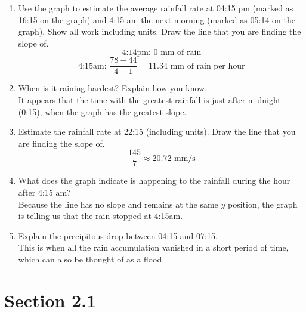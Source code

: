 \documentclass{article}
\begin{document}
\begin{enumerate}
\begin{enumerate}
	\item Use the graph to estimate the average rainfall rate at 04:15 pm (marked as 16:15 on the graph) and 4:15 am the next morning (marked as 05:14 on the graph). Show all work including units. Draw the line that you are finding the slope of. $$\text{4:14pm: }0 \text{ mm of rain}$$
	$$\text{4:15am: }\frac{78-44}{4-1}=11.34 \text{ mm of rain per hour}$$ 
	\item When is it raining hardest? Explain how you know.\\
		It appears that the time with the greatest rainfall is just after midnight (0:15), when the graph has the greatest slope.
	\item Estimate the rainfall rate at 22:15 (including units). Draw the line that you are finding the slope of.\\
		$$\frac{145}{7}\approx 20.72 \text{ mm/s}$$
	\item What does the graph indicate is happening to the rainfall during the hour after 4:15 am?\\
		Because the line has no slope and remains at the same $y$ position, the graph is telling us that the rain stopped at 4:15am.
	\item Explain the precipitous drop between 04:15 and 07:15. \\
		This is when all the rain accumulation vanished in a short period of time, which can also be thought of as a flood.
\end{enumerate}

\end{enumerate}


\section{Section 2.1}
\end{document}
